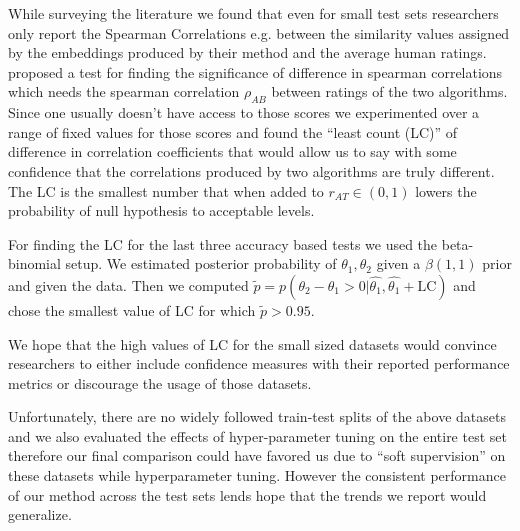 While surveying the literature we found that even for small test sets researchers only report the Spearman Correlations e.g. \cite{hill2014not,faruqui2014improving,faruqui2014retrofitting} between the similarity values assigned by the embeddings produced by their method and the
average human ratings.  proposed a test for finding the significance of difference in spearman correlations which needs the spearman correlation $\rho_{AB}$ between ratings of the two algorithms. Since one usually doesn't have access to
those scores  we experimented over a range of fixed values for those
scores and found the ``least count (LC)'' of difference in correlation coefficients that would allow us to say with
some confidence that the correlations produced by two algorithms are
truly different. The LC is the smallest number that 
when added to $r_{AT} \in (0, 1)$ lowers the probability of null
hypothesis to acceptable levels.

For finding the LC for the last three accuracy based tests we
used the beta-binomial setup.  We estimated posterior
probability of $\theta_1, \theta_2$ given a $\beta(1,1)$ prior and
given the data. Then we computed $\tilde{p} = p(\theta_2 - \theta_1 >
0 | \hat{\theta_1}, \hat{\theta_1} + \textrm{LC})$ and chose
the smallest value of LC for which $\tilde{p} > 0.95$.

We hope that
the high values of LC for the small sized datasets would convince
researchers to either include confidence measures with their reported
performance metrics or discourage the usage of those datasets.

Unfortunately, there are no widely followed train-test splits of the above
datasets and we also evaluated the effects of hyper-parameter tuning
on the entire test set therefore our final comparison could have
favored us due to ``soft supervision'' on these datasets while
hyperparameter tuning. However the consistent performance of our
method across the test sets lends hope that the trends we report would
generalize. 

